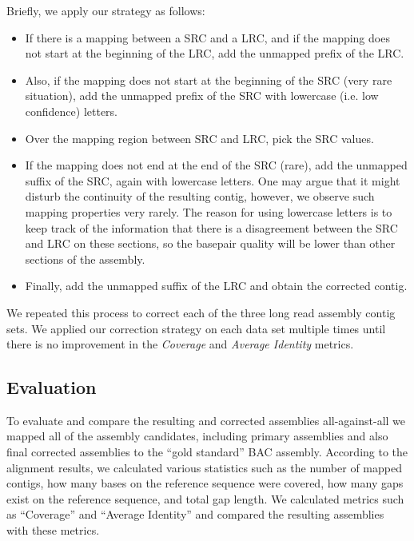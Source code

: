 \documentclass{llncs}
\begin{document}
Briefly, we apply our  strategy as follows: 
\begin{itemize}
\item If there is a mapping between a SRC and a LRC, and if the mapping does not start at the beginning of the LRC, add the unmapped prefix of the LRC. 
\item Also, if the mapping does not start at the beginning of the SRC (very rare situation), add the unmapped prefix of the SRC with lowercase (i.e. low confidence) letters. 
\item Over the mapping region between SRC and LRC, pick the SRC values. 
\item If the mapping does not end at the end of the SRC (rare), add the unmapped suffix of the SRC, again with lowercase letters. One may argue that it might disturb the continuity of the resulting contig, however, we observe such mapping properties very rarely. The reason for using lowercase letters is to keep track of the information that there is a disagreement between the SRC and LRC on these sections, so the basepair quality will be lower than other sections of the assembly. 
\item Finally, add the unmapped suffix of the LRC and obtain the corrected contig.
\end{itemize}
We repeated this process to correct each of the three long read assembly contig sets. We applied our correction strategy on each data set multiple times until there is no improvement in the
{\it Coverage} and  {\it Average Identity} metrics. 

\subsection{Evaluation}

To evaluate and compare the resulting and corrected assemblies all-against-all we mapped all of the assembly candidates, including primary assemblies and also final corrected assemblies to the ``gold standard'' BAC assembly. According to the alignment results, we calculated various statistics such as the number of mapped contigs, how many bases on the reference sequence were covered, how many gaps exist on the reference sequence, and total gap length. We calculated metrics such as ``Coverage'' and ``Average Identity'' and compared the resulting assemblies with these metrics. 
\end{document}
